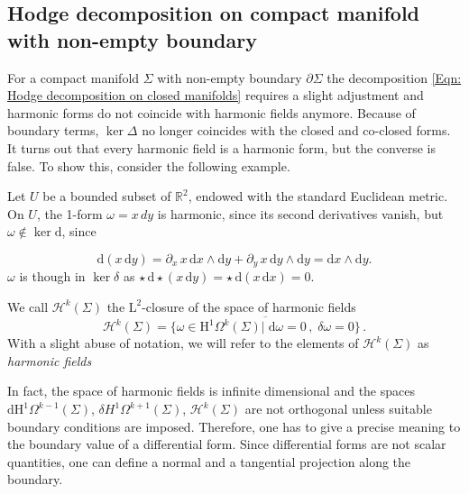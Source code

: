 \subsection{Hodge decomposition on compact manifold with non-empty boundary}
For a compact manifold $\Sigma$ with non-empty boundary $\partial\Sigma$ the decomposition \eqref{Eqn: Hodge decomposition on closed manifolds} requires a slight adjustment and harmonic forms do not coincide with harmonic fields anymore.
Because of boundary terms, $\ker\Delta$ no longer coincides with the closed and co-closed forms. It turns out that every harmonic field is a harmonic form, but the converse is false. To show this, consider the following example.
\begin{Example}
	Let $U$ be a bounded subset of $\mathbb{R}^2$, endowed with the standard Euclidean metric. On $U$, the 1-form $\omega=x \,dy$ is harmonic, since its second derivatives vanish, but $\omega\notin\ker \mathrm{d}$, since
	
	\[\mathrm{d}(x\, \mathrm{d}y) = \partial_x\, x\, \mathrm{d}x \wedge \mathrm{d}y + \partial_y\, x\, \mathrm{d}y \wedge \mathrm{d}y = \mathrm{d}x \wedge \mathrm{d}y.\] $\omega$ is though in $\ker \delta$ as $\star\, \mathrm{d} \star (x\, \mathrm{d}y) =\star\, \mathrm{d}(x \,\mathrm{d}x) = 0$.
\end{Example}
\begin{Definition}
	We call $\mathcal{H}^k(\Sigma)$ the $\mathrm{L}^2$-closure of the space of harmonic fields
	\begin{equation}\label{Eqn: harmonic fields}
		\mathcal{H}^k(\Sigma)=\overline{\lbrace\omega\in \mathrm{H}^1\Omega^k(\Sigma)|\;\mathrm{d}\omega=0\,,\;\delta\omega=0\rbrace}\,.
	\end{equation}
	With a slight abuse of notation, we will refer to the elements of $\mathcal{H}^k(\Sigma)$ as \emph{harmonic fields}
\end{Definition}



In fact, the space of harmonic fields is infinite dimensional and the spaces $\mathrm{d} \mathrm{H}^1\Omega^{k-1}(\Sigma)$, $\delta H^{1}\Omega^{k+1}(\Sigma)$, $\mathcal{H}^k(\Sigma)$ are not orthogonal unless suitable boundary conditions are imposed.
Therefore, one has to give a precise meaning to the boundary value of a differential form. Since differential forms are not scalar quantities, one can define a normal and a tangential projection along the boundary.

